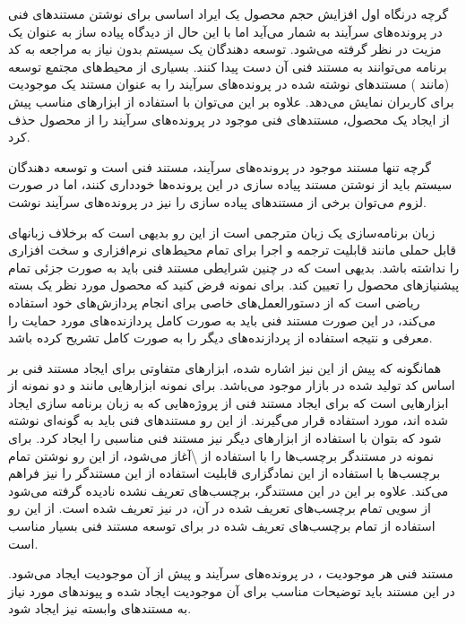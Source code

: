 گرچه درنگاه اول افزایش حجم محصول یک ایراد اساسی برای نوشتن مستندهای فنی در
پرونده‌های سرآیند به شمار می‌آید اما با این حال از دیدگاه پیاده ساز به عنوان یک
مزیت در نظر گرفته می‌شود. توسعه دهندگان یک سیستم بدون نیاز به مراجعه به کد
برنامه می‌توانند به مستند فنی آن دست پیدا کنند. بسیاری از محیط‌های مجتمع توسعه
(مانند ) مستندهای نوشته شده در پرونده‌های سرآیند را به عنوان مستند
یک موجودیت برای کاربران نمایش می‌دهد. علاوه بر این می‌توان با استفاده از ابزارهای
مناسب پیش از ایجاد یک محصول، مستندهای فنی موجود در پرونده‌های سرآیند را از محصول
حذف کرد.

\begin{note}
گرچه تنها مستند موجود در پرونده‌های سرآیند، مستند فنی است و توسعه دهندگان سیستم
باید از نوشتن مستند پیاده سازی در این پرونده‌ها خودداری کنند، اما در صورت لزوم
می‌توان برخی از مستندهای پیاده سازی را نیز در پرونده‌های سرآیند نوشت.
\end{note}

زبان برنامه‌سازی  یک زبان مترجمی است از این رو بدیهی است که برخلاف
زبانهای قابل حملی مانند  قابلیت ترجمه و اجرا برای تمام محیط‌های
نرم‌افزاری و سخت افزاری را نداشته باشد. بدیهی است که در چنین شرایطی مستند فنی
باید به صورت جزئی تمام پیشنیازهای محصول را تعیین کند. برای نمونه فرض کنید که
محصول مورد نظر یک بسته ریاضی است که از دستورالعمل‌های خاصی برای انجام پردازش‌های
خود استفاده می‌کند، در این صورت مستند فنی باید به صورت کامل پردازنده‌های مورد
حمایت را معرفی و نتیجه استفاده از پردازنده‌های دیگر را به صورت کامل تشریح کرده
باشد.

همانگونه که پیش از این نیز اشاره شده، ابزارهای متفاوتی برای ایجاد مستند فنی بر
اساس کد تولید شده در بازار موجود می‌باشد. برای نمونه ابزارهایی مانند 
و  دو نمونه از ابزارهایی است که برای ایجاد مستند فنی از پروژه‌هایی که
به زبان برنامه سازی  ایجاد شده اند، مورد استفاده قرار می‌گیرند. از این
رو مستند‌های فنی باید به گونه‌ای نوشته شود که بتوان با استفاده از ابزارهای دیگر
نیز مستند فنی مناسبی را ایجاد کرد. برای نمونه در مستندگر  برچسب‌ها را
با استفاده از \textbackslash آغاز می‌شود، از این رو نوشتن تمام برچسب‌ها با استفاده
از این نمادگزاری قابلیت استفاده از این مستندگر را نیز فراهم می‌کند.
علاوه بر این در این مستندگر، برچسب‌های تعریف نشده نادیده گرفته می‌شود از سویی
تمام برچسب‌های تعریف شده در آن، در  نیز تعریف شده است. از این رو
استفاده از تمام برچسب‌های تعریف شده در  برای توسعه مستند فنی بسیار
مناسب است.

مستند فنی هر موجودیت ، در پرونده‌های سرآیند و پیش از آن موجودیت ایجاد می‌شود. در
این مستند باید توضیحات مناسب برای آن موجودیت ایجاد شده و پیوندهای مورد نیاز به
مستندهای وابسته نیز ایجاد شود.

